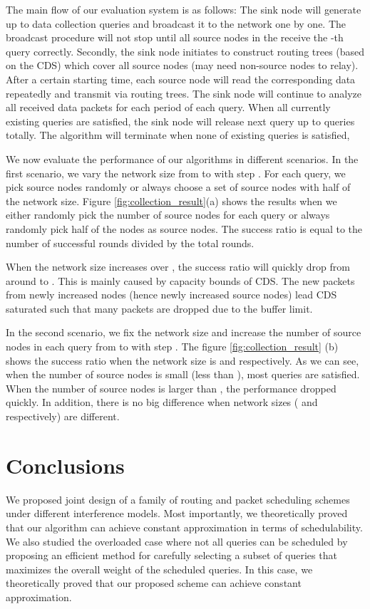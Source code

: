 \documentclass[conference,10pt]{IEEEtran}\usepackage{amsmath}
\begin{document}
The main flow of our evaluation system is as follows: The sink node
will generate up to  data collection
 queries and broadcast it to the network one by one.
The broadcast procedure will not stop until all source nodes in the
 receive  the -th query correctly.
Secondly, the sink node initiates
 to construct
 routing trees (based on the CDS) which cover all source nodes (may need non-source nodes
   to relay).
After a certain starting time, each source node will read the corresponding data
  repeatedly and transmit via routing trees.
The sink node will continue to analyze all received data packets
 for each period of each query.
When all currently existing queries are satisfied, the sink node
 will release next query up to  queries totally.
The algorithm will
terminate when none of existing queries is satisfied,

We now evaluate the performance of our algorithms in different
scenarios. In the first scenario,
 we vary the network size from  to  with step .
For each query, we pick source nodes randomly or always choose a set
of
 source nodes with half of the network size.
Figure \ref{fig:collection_result}(a) shows the results when we
either randomly pick the number
 of source nodes for each query or always randomly pick half of the nodes as
 source nodes.
The success ratio is equal to the number of successful rounds
divided by the total rounds.

When the network size increases over , the success ratio will
quickly
 drop from around  to .
This is mainly caused by capacity bounds of CDS. The new packets
from newly increased nodes (hence newly increased source nodes) lead
CDS
 saturated such that many packets are dropped due to the buffer limit.


In the second scenario, we fix the network size and increase the
number of source nodes
 in each query from  to  with step .
The figure \ref{fig:collection_result} (b) shows the success ratio
when the network size is
  and  respectively.
As we can see, when the number of source nodes is small (less than
),
 most queries are satisfied.
When the number of source nodes is larger than , the performance
dropped quickly. In addition, there is no big difference when
network sizes ( and  respectively) are
 different.


\section{Conclusions}
\label{sec:conclusion}

We proposed joint design of a family of routing and packet
scheduling schemes under different interference models. Most
importantly, we theoretically proved that our algorithm can achieve
constant approximation in terms of schedulability. We also studied
the overloaded case where not all queries can be scheduled by
proposing an efficient method for carefully selecting a subset of
queries that maximizes the overall weight of the scheduled queries.
In this case, we theoretically proved that our proposed scheme
 can achieve constant approximation.
\end{document}
